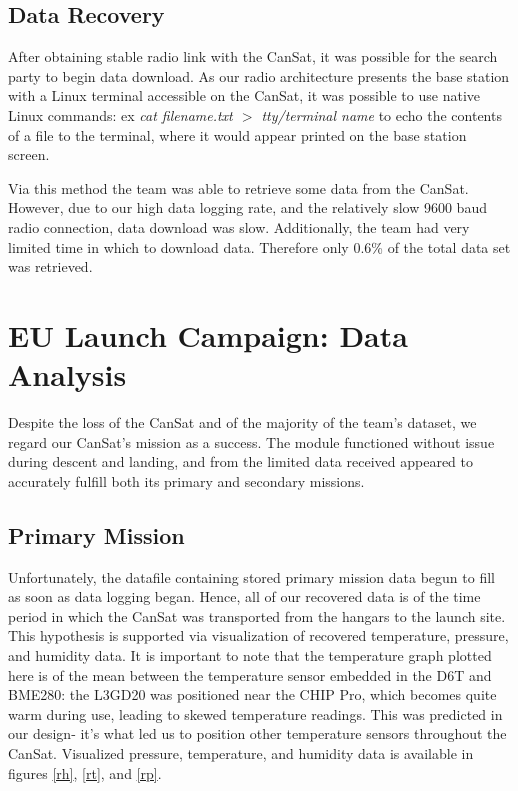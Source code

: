\documentclass[]{report}
\begin{document}
	\subsection{Data Recovery}
	
	After obtaining stable radio link with the CanSat, it was possible for the search party to begin data download. As our radio architecture presents the base station with a Linux terminal accessible on the CanSat, it was possible to use native Linux commands: ex \textit{cat filename.txt $>$ tty/terminal name} to echo the contents of a file to the terminal, where it would appear printed on the base station screen.
	
	Via this method the team was able to retrieve some data from the CanSat. However, due to our high data logging rate, and the relatively slow 9600 baud radio connection, data download was slow. Additionally, the team had very limited time in which to download data. Therefore only 0.6\% of the total data set was retrieved.
	
	\section{EU Launch Campaign: Data Analysis}
	Despite the loss of the CanSat and of the majority of the team's dataset, we regard our CanSat's mission as a success. The module functioned without issue during descent and landing, and from the limited data received appeared to accurately fulfill both its primary and secondary missions.
	
	\subsection{Primary Mission}
	
	Unfortunately, the datafile containing stored primary mission data begun to fill as soon as data logging began. Hence, all of our recovered data is of the time period in which the CanSat was transported from the hangars to the launch site. This hypothesis is supported via visualization of recovered temperature, pressure, and humidity data. It is important to note that the temperature graph plotted here is of the mean between the temperature sensor embedded in the D6T and BME280: the L3GD20 was positioned near the CHIP Pro, which becomes quite warm during use, leading to skewed temperature readings. This was predicted in our design- it's what led us to position other temperature sensors throughout the CanSat. Visualized pressure, temperature, and humidity data is available in figures \ref{rh}, \ref{rt}, and \ref{rp}.
	
\end{document}
